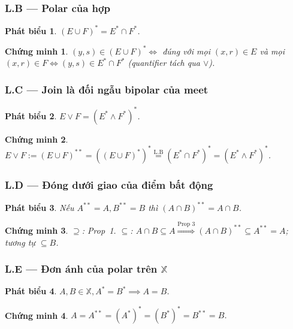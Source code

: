 \documentclass[11pt]{article}
\theoremstyle{plainlabel}
\newtheorem*{phatbieu}{Phát biểu}
\newtheorem*{chungminh}{Chứng minh}
\begin{document}
\subsubsection*{L.B --- Polar của hợp}
\begin{phatbieu} $(E\cup F)^*=E^*\cap F^*$. \end{phatbieu}
\begin{chungminh} $(y,s)\in(E\cup F)^*\iff$ đúng với mọi $(x,r)\in E$ \emph{và} mọi $(x,r)\in F\iff(y,s)\in E^*\cap F^*$ (quantifier tách qua $\vee$). \end{chungminh}

\subsubsection*{L.C --- Join là đối ngẫu bipolar của meet}
\begin{phatbieu} $E\vee F=(E^*\wedge F^*)^*$. \end{phatbieu}
\begin{chungminh} $E\vee F:=(E\cup F)^{**}=((E\cup F)^*)^*\overset{\text{L.B}}{=}(E^*\cap F^*)^*=(E^*\wedge F^*)^*$. \end{chungminh}

\subsubsection*{L.D --- Đóng dưới giao của điểm bất động}
\begin{phatbieu} Nếu $A^{**}=A,B^{**}=B$ thì $(A\cap B)^{**}=A\cap B$. \end{phatbieu}
\begin{chungminh} $\supseteq$: Prop~1. $\subseteq$: $A\cap B\subseteq A\overset{\text{Prop 3}}{\Rightarrow}(A\cap B)^{**}\subseteq A^{**}=A$; tương tự $\subseteq B$. \end{chungminh}

\subsubsection*{L.E --- Đơn ánh của polar trên $\mathbb X$}
\begin{phatbieu} $A,B\in\mathbb X, A^*=B^*\implies A=B$. \end{phatbieu}
\begin{chungminh} $A=A^{**}=(A^*)^*=(B^*)^*=B^{**}=B$. \end{chungminh}
\end{document}

